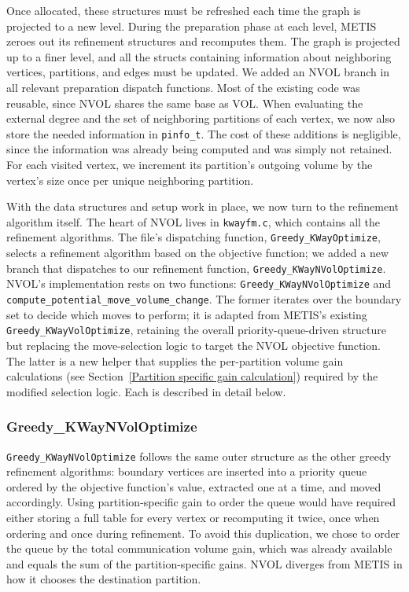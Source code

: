 Once allocated, these structures must be refreshed each time the graph is projected to a new level. During the preparation phase at each level, METIS zeroes out its refinement structures and recomputes them. The graph is projected up to a finer level, and all the structs containing information about neighboring vertices, partitions, and edges must be updated. We added an NVOL branch in all relevant preparation dispatch functions. Most of the existing code was reusable, since NVOL shares the same base as VOL. When evaluating the external degree and the set of neighboring partitions of each vertex, we now also store the needed information in \texttt{pinfo\_t}. The cost of these additions is negligible, since the information was already being computed and was simply not retained. For each visited vertex, we increment its partition's outgoing volume by the vertex's size once per unique neighboring partition.

With the data structures and setup work in place, we now turn to the refinement algorithm itself. The heart of NVOL lives in \texttt{kwayfm.c}, which contains all the refinement algorithms. The file's dispatching function, \texttt{Greedy\_KWayOptimize}, selects a refinement algorithm based on the objective function; we added a new branch that dispatches to our refinement function, \texttt{Greedy\_KWayNVolOptimize}. NVOL's implementation rests on two functions: \texttt{Greedy\_KWayNVolOptimize} and \texttt{compute\_potential\_move\_volume\_change}. The former iterates over the boundary set to decide which moves to perform; it is adapted from METIS's existing \texttt{Greedy\_KWayVolOptimize}, retaining the overall priority-queue-driven structure but replacing the move-selection logic to target the NVOL objective function. The latter is a new helper that supplies the per-partition volume gain calculations (see Section~\ref{Partition specific gain calculation}) required by the modified selection logic. Each is described in detail below. 

\subsubsection{Greedy\_KWayNVolOptimize}
\texttt{Greedy\_KWayNVolOptimize} follows the same outer structure as the other greedy refinement algorithms: boundary vertices are inserted into a priority queue ordered by the objective function's value, extracted one at a time, and moved accordingly. Using partition-specific gain to order the queue would have required either storing a full table for every vertex or recomputing it twice, once when ordering and once during refinement. To avoid this duplication, we chose to order the queue by the total communication volume gain, which was already available and equals the sum of the partition-specific gains. NVOL diverges from METIS in how it chooses the destination partition.

